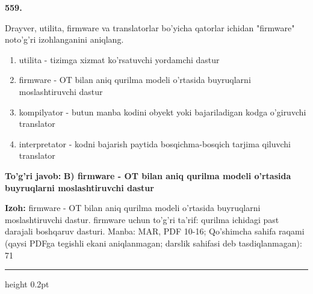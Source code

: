 \documentclass[10pt,a4paper]{article}
\begin{document}
{\bfseries\sffamily\color{ink} 559.}
\par
Drayver, utilita, firmware va translatorlar bo'yicha qatorlar ichidan "firmware" noto'g'ri izohlanganini aniqlang.
\begin{enumerate}[label=\Alph*),leftmargin=9mm]
\item utilita - tizimga xizmat ko'rsatuvchi yordamchi dastur
\item firmware - OT bilan aniq qurilma modeli o'rtasida buyruqlarni moslashtiruvchi dastur
\item kompilyator - butun manba kodini obyekt yoki bajariladigan kodga o'giruvchi translator
\item interpretator - kodni bajarish paytida bosqichma-bosqich tarjima qiluvchi translator
\end{enumerate}
\begin{tcolorbox}[enhanced,breakable,colback=teal!4,colframe=teal!60!black,boxrule=0.45pt,arc=1.2mm,left=2.7mm,right=2.7mm,top=1.8mm,bottom=1.8mm,before skip=2mm,after skip=2mm]
{\bfseries\sffamily\color{teal}To'g'ri javob:} \textbf{B) firmware - OT bilan aniq qurilma modeli o'rtasida buyruqlarni moslashtiruvchi dastur}
\par\smallskip
{\bfseries Izoh:} firmware - OT bilan aniq qurilma modeli o'rtasida buyruqlarni moslashtiruvchi dastur. firmware uchun to'g'ri ta'rif: qurilma ichidagi past darajali boshqaruv dasturi. Manba: MAR, PDF 10-16; Qo'shimcha sahifa raqami (qaysi PDFga tegishli ekani aniqlanmagan; darslik sahifasi deb tasdiqlanmagan): 71
\end{tcolorbox}
\vspace{2mm}\hrule height 0.2pt\vspace{3mm}
\end{document}
